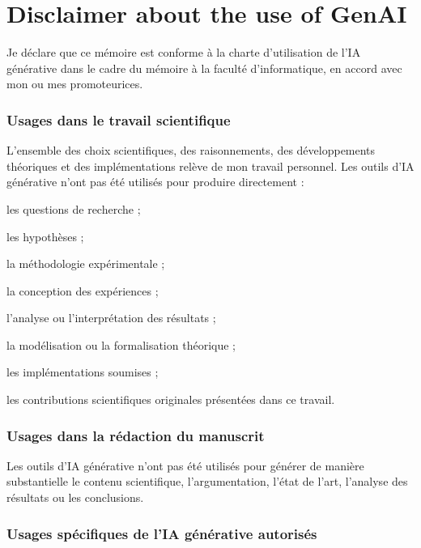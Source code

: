 
\chapter*{Disclaimer about the use of GenAI}

Je déclare que ce mémoire est conforme à la charte d’utilisation de l’IA générative dans le cadre du mémoire à la faculté d’informatique, en accord avec mon ou mes promoteurices.

\subsection*{Usages dans le travail scientifique}

L’ensemble des choix scientifiques, des raisonnements, des développements théoriques et des implémentations relève de mon travail personnel. Les outils d’IA générative n’ont pas été utilisés pour produire directement :
\begin{compactitem}
    \item les questions de recherche ;
    \item les hypothèses ;
    \item la méthodologie expérimentale ;
    \item la conception des expériences ;
    \item l’analyse ou l’interprétation des résultats ;
    \item la modélisation ou la formalisation théorique ;
    \item les implémentations soumises ;
    \item les contributions scientifiques originales présentées dans ce travail.
\end{compactitem}

\subsection*{Usages dans la rédaction du manuscrit}

Les outils d’IA générative n’ont pas été utilisés pour générer de manière substantielle le contenu scientifique, l’argumentation, l’état de l’art, l’analyse des résultats ou les conclusions.

\subsection*{Usages spécifiques de l’IA générative autorisés}

